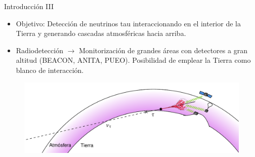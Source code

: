 \documentclass{beamer}
\begin{document}
\begin{frame}{Introducción III}
	\begin{itemize}
		\item Objetivo: Detección de neutrinos tau interaccionando en el interior de la Tierra y generando cascadas atmosféricas hacia arriba. 
		\item Radiodetección $\rightarrow$ Monitorización de grandes áreas con detectores a gran altitud (BEACON, ANITA, PUEO). Posibilidad de emplear la Tierra como blanco de interacción.
	\end{itemize}
	\begin{figure}[H]
	\centering
	\includegraphics[width=1\linewidth]{figures/shower_up_v2}
	\end{figure}
\end{frame}
\end{document}
